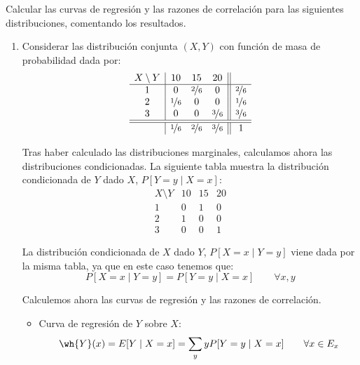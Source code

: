 \begin{ejercicio}
    Calcular las curvas de regresión y las razones de correlación para las siguientes distribuciones, comentando los resultados.
    \begin{enumerate}
        \item Considerar las distribución conjunta $(X,Y)$ con función de masa de probabilidad dada por:
        \begin{equation*}
            \begin{array}{c|ccc||c}
                X\setminus Y & 10 & 15 & 20 & \\
                \hline
                1 & 0 & \nicefrac{2}{6} & 0 & \nicefrac{2}{6}\\
                2 & \nicefrac{1}{6} & 0 & 0 & \nicefrac{1}{6}\\
                3 & 0 & 0 & \nicefrac{3}{6} & \nicefrac{3}{6}\\
                \hline \hline
                & \nicefrac{1}{6} & \nicefrac{2}{6} & \nicefrac{3}{6} & 1
            \end{array}
        \end{equation*}

        Tras haber calculado las distribuciones marginales, calculamos ahora las distribuciones condicionadas.
        La siguiente tabla muestra la distribución condicionada de $Y$ dado $X$, $P[Y = y\mid X = x]$:
        \begin{equation*}
            \begin{array}{c|ccc}
                X\setminus Y & 10 & 15 & 20 \\
                \hline
                1 & 0 & 1 & 0\\
                2 & 1 & 0 & 0\\
                3 & 0 & 0 & 1
            \end{array}
        \end{equation*}

        La distribución condicionada de $X$ dado $Y$, $P[X = x\mid Y = y]$ viene dada por la misma tabla, ya que en este caso tenemos que:
        \begin{equation*}
            P[X = x\mid Y = y] = P[Y = y\mid X = x] \qquad \forall x, y
        \end{equation*}

        Calculemos ahora las curvas de regresión y las razones de correlación.
        \begin{itemize}
            \item Curva de regresión de $Y$ sobre $X$:
            \begin{equation*}
                \wh{Y}(x) = E[Y\mid X = x] = \sum_{y} y P[Y = y\mid X = x] \qquad \forall x\in E_x
            \end{equation*}
    

\end{itemize}
\end{enumerate}
\end{ejercicio}
